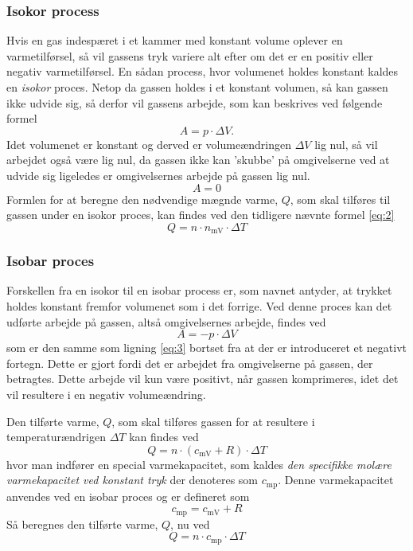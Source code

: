 \documentclass[SRC.tex]{subfiles}
\begin{document}
	\subsubsection{Isokor process} 
	Hvis en gas indespæret i et kammer med konstant volume oplever en varmetilførsel, så vil 
	gassens tryk variere alt efter om det er en positiv eller negativ varmetilførsel. En sådan
	process, hvor volumenet holdes konstant kaldes en \textit{isokor} proces. Netop da gassen
	holdes i et konstant volumen, så kan gassen ikke udvide sig, så derfor vil gassens arbejde,
	som kan beskrives ved følgende formel
	\begin{equation}
	A = p \cdot \Delta V.
	\label{eq:3}
	\end{equation}
	Idet volumenet er konstant og derved er volumeændringen \(\Delta V\) lig nul, så vil arbejdet
	også være lig nul, da gassen ikke kan 'skubbe' på omgivelserne ved at udvide sig ligeledes er 
	omgivelsernes arbejde på gassen lig nul.
	\begin{equation}
	A = 0
	\end{equation}
	Formlen for at beregne den nødvendige mægnde varme, \(Q\), som skal tilføres til gassen under 
	en isokor proces, kan findes ved den tidligere nævnte formel \eqref{eq:2}
	\begin{equation}
	Q = n \cdot n_{\text{mV}} \cdot \Delta T
	\end{equation}
	
	\subsubsection{Isobar proces}
	Forskellen fra en isokor til en isobar process er, som
	navnet antyder, at trykket 
	holdes konstant fremfor volumenet som i det forrige. Ved
	denne proces kan det udførte arbejde på gassen, altså 
	omgivelsernes arbejde, findes ved
	\begin{equation}
	A = -p \cdot \Delta V
	\end{equation}
	som er den samme som ligning \eqref{eq:3} bortset fra at
	der er introduceret et negativt fortegn. Dette er gjort fordi det er arbejdet fra omgivelserne 
	på gassen, der betragtes. Dette arbejde vil kun være positivt, når gassen komprimeres, idet det 
	vil resultere i en negativ volumeændring.  
	
	Den tilførte varme, \(Q\), som skal tilføres gassen for at 
	resultere i temperaturændrigen \(\Delta T\) kan findes ved
	\begin{equation}
	Q = n \cdot (c_{\text{mV}} + R) \cdot \Delta T
	\end{equation} 
	hvor man indfører en special varmekapacitet, som kaldes \textit{den specifikke molære varmekapacitet ved konstant tryk} der denoteres som \(c_{\text{mp}}\). Denne varmekapacitet anvendes ved en isobar proces og er defineret som
	\begin{equation}
	c_{\text{mp}} = c_{\text{mV}} + R
	\end{equation}
	Så beregnes den tilførte varme, \(Q\), nu ved
	\begin{equation}
	Q = n \cdot c_{\text{mp}} \cdot \Delta T
	\end{equation}
\end{document}
